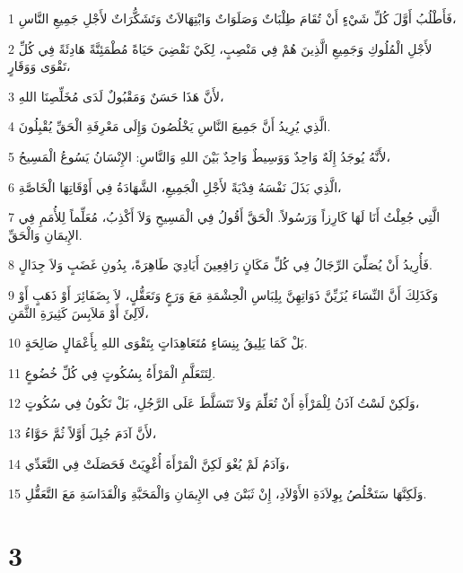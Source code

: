 \par 1 فَأَطْلُبُ أَوَّلَ كُلِّ شَيْءٍ أَنْ تُقَامَ طِلْبَاتٌ وَصَلَوَاتٌ وَابْتِهَالاَتٌ وَتَشَكُّرَاتٌ لأَجْلِ جَمِيعِ النَّاسِ،
\par 2 لأَجْلِ الْمُلُوكِ وَجَمِيعِ الَّذِينَ هُمْ فِي مَنْصِبٍ، لِكَيْ نَقْضِيَ حَيَاةً مُطْمَئِنَّةً هَادِئَةً فِي كُلِّ تَقْوَى وَوَقَارٍ،
\par 3 لأَنَّ هَذَا حَسَنٌ وَمَقْبُولٌ لَدَى مُخَلِّصِنَا اللهِ،
\par 4 الَّذِي يُرِيدُ أَنَّ جَمِيعَ النَّاسِ يَخْلُصُونَ وَإِلَى مَعْرِفَةِ الْحَقِّ يُقْبِلُونَ.
\par 5 لأَنَّهُ يُوجَدُ إِلَهٌ وَاحِدٌ وَوَسِيطٌ وَاحِدٌ بَيْنَ اللهِ وَالنَّاسِ: الإِنْسَانُ يَسُوعُ الْمَسِيحُ،
\par 6 الَّذِي بَذَلَ نَفْسَهُ فِدْيَةً لأَجْلِ الْجَمِيعِ، الشَّهَادَةُ فِي أَوْقَاتِهَا الْخَاصَّةِ،
\par 7 الَّتِي جُعِلْتُ أَنَا لَهَا كَارِزاً وَرَسُولاً. الْحَقَّ أَقُولُ فِي الْمَسِيحِ وَلاَ أَكْذِبُ، مُعَلِّماً لِلأُمَمِ فِي الإِيمَانِ وَالْحَقِّ.
\par 8 فَأُرِيدُ أَنْ يُصَلِّيَ الرِّجَالُ فِي كُلِّ مَكَانٍ رَافِعِينَ أَيَادِيَ طَاهِرَةً، بِدُونِ غَضَبٍ وَلاَ جِدَالٍ.
\par 9 وَكَذَلِكَ أَنَّ النِّسَاءَ يُزَيِّنَّ ذَوَاتِهِنَّ بِلِبَاسِ الْحِشْمَةِ مَعَ وَرَعٍ وَتَعَقُّلٍ، لاَ بِضَفَائِرَ أَوْ ذَهَبٍ أَوْ لَآلِئَ أَوْ مَلاَبِسَ كَثِيرَةِ الثَّمَنِ،
\par 10 بَلْ كَمَا يَلِيقُ بِنِسَاءٍ مُتَعَاهِدَاتٍ بِتَقْوَى اللهِ بِأَعْمَالٍ صَالِحَةٍ.
\par 11 لِتَتَعَلَّمِ الْمَرْأَةُ بِسُكُوتٍ فِي كُلِّ خُضُوعٍ.
\par 12 وَلَكِنْ لَسْتُ آذَنُ لِلْمَرْأَةِ أَنْ تُعَلِّمَ وَلاَ تَتَسَلَّطَ عَلَى الرَّجُلِ، بَلْ تَكُونُ فِي سُكُوتٍ،
\par 13 لأَنَّ آدَمَ جُبِلَ أَوَّلاً ثُمَّ حَوَّاءُ،
\par 14 وَآدَمُ لَمْ يُغْوَ لَكِنَّ الْمَرْأَةَ أُغْوِيَتْ فَحَصَلَتْ فِي التَّعَدِّي،
\par 15 وَلَكِنَّهَا سَتَخْلُصُ بِوِلاَدَةِ الأَوْلاَدِ، إِنْ ثَبَتْنَ فِي الإِيمَانِ وَالْمَحَبَّةِ وَالْقَدَاسَةِ مَعَ التَّعَقُّلِ.

\chapter{3}

